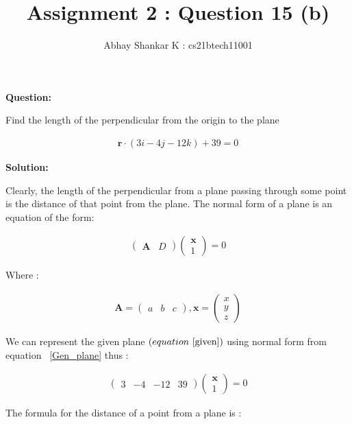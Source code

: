\documentclass[journal,12pt,twocolumn]{IEEEtran}
\begin{document}
	\title{Assignment 2 : Question 15 (b)}
	\author{ Abhay Shankar K : cs21btech11001}

	\maketitle

	\bigskip

	\providecommand{\brak}[1]{\ensuremath{\left(#1\right)}}
	\providecommand{\abs}[1]{\left\vert#1\right\vert}
	\providecommand{\norm}[1]{\left\lVert#1\right\rVert}
	\newcommand{\solution}{\noindent \textbf{Solution: }}
	\newcommand{\question}{\noindent \textbf{Question: }}

	\newcommand{\myvec}[1]{\ensuremath{\begin{pmatrix}#1\end{pmatrix}}}
	\let\vec\mathbf


	\question


	Find the length of the perpendicular from the origin to the plane
	
	\begin{align} 
			\label{given}
		\vec{r} \cdot \brak{3i - 4j - 12k} + 39 = 0
	\end{align}


	\solution
	
	
	Clearly, the length of the perpendicular from a plane passing through some point is the distance of that point from the plane.
	The normal form of a plane is an equation of the form:
	
	\begin{align}
		\myvec{\vec{A} & D} \myvec{\vec{x} \\ 1} = 0
			\label{Gen_plane}
	\end{align}


	Where :
	
	\begin{align}
		\vec{A} = \myvec{a & b & c}, 
		\vec{x} = \myvec{x \\ y \\ z}
	\end{align}


	We can represent the given plane \brak{equation ~\eqref{given}} using normal form from equation ~\eqref{Gen_plane} thus :
	
	\begin{align}
		\myvec{3 & -4 & -12 & 39} \myvec{\vec{x} \\ 1} = 0
			\label{pln_nrm}
	\end{align}
	
	
	The formula for the distance of a point from a plane is :
	
\end{document}
